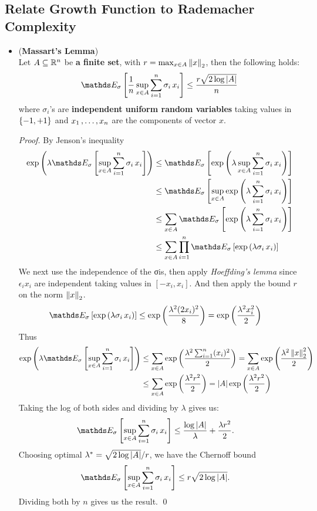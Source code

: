 \documentclass[11pt]{article}
\begin{document}
\subsection{Relate Growth Function to Rademacher Complexity}
\begin{itemize}
\item \begin{lemma}(\textbf{Massart's Lemma}) \citep{mohri2018foundations}\\
Let $A \subseteq {\mathbb R}^n$ be \textbf{a finite set}, with $r = \max_{x \in A}\left\|x\right\|_{2}$, then the following holds:
\begin{align}
\E{\sigma}{\frac{1}{n}\sup_{x \in A}\sum_{i=1}^{n}\sigma_i\,x_i} \le \frac{r\sqrt{2 \log\abs{A}}}{n} \label{eqn: massart_lemma}
\end{align}
where $\sigma_i$'s are \textbf{independent uniform random variables} taking values in $\left\{-1, +1\right\}$ and $x_1 \,{,}\ldots{,}\, x_n$ are the components of vector $x$.
\end{lemma}
\begin{proof} By Jenson's inequality
\begin{align*}
\exp\paren{\lambda \E{\sigma}{\sup_{x \in A}\sum_{i=1}^{n}\sigma_i\,x_i}} &\le \E{\sigma}{\exp\paren{\lambda \sup_{x \in A}\sum_{i=1}^{n}\sigma_i\,x_i}}\\
&\le \E{\sigma}{\sup_{x \in A}\exp\paren{\lambda \sum_{i=1}^{n}\sigma_i\,x_i}}\\
&\le \sum_{x \in A}\E{\sigma}{\exp\paren{\lambda \sum_{i=1}^{n}\sigma_i\,x_i}} \\
&\le  \sum_{x \in A}\prod_{i=1}^n\E{\sigma}{\exp\paren{\lambda \sigma_i\,x_i}}
\end{align*} We next use the independence of the σis, then apply \emph{Hoeffding's lemma} since $\epsilon_i x_i$ are independent taking values in $[-x_i, x_i]$. And then apply the bound $r$ on the norm $\left\|x\right\|_{2}$.
\begin{align*}
\E{\sigma}{\exp\paren{\lambda \sigma_i\,x_i}} &\le \exp\paren{\frac{\lambda^2 (2x_i)^2}{8}} = \exp\paren{\frac{\lambda^2 x_i^2}{2}}
\end{align*} Thus
\begin{align*}
\exp\paren{\lambda \E{\sigma}{\sup_{x \in A}\sum_{i=1}^{n}\sigma_i\,x_i}} &\le  \sum_{x \in A}\exp\paren{\frac{\lambda^2 \sum_{i=1}^n (x_i)^2}{2}} =  \sum_{x \in A}\exp\paren{\frac{\lambda^2 \norm{x}{2}^2}{2}} \\
&\le \sum_{x \in A}\exp\paren{\frac{\lambda^2 r^2}{2}} = \abs{A}\exp\paren{\frac{\lambda^2 r^2}{2}}
\end{align*} Taking the log of both sides and dividing by $\lambda$ gives us:
\begin{align*}
\E{\sigma}{\sup_{x \in A}\sum_{i=1}^{n}\sigma_i\,x_i} &\le \frac{\log\abs{A}}{\lambda} + \frac{\lambda r^2}{2}.
\end{align*} Choosing optimal $\lambda^{*} = \sqrt{2\log\left\lvert A \right\rvert}/r$, we have the Chernoff bound
\begin{align*}
\E{\sigma}{\sup_{x \in A}\sum_{i=1}^{n}\sigma_i\,x_i} &\le r\sqrt{2 \log\abs{A}}.
\end{align*}Dividing both by $n$ gives us the result. \qed
\end{proof}


\end{itemize}
\end{document}
